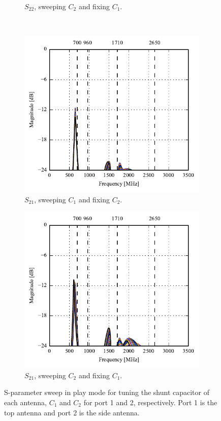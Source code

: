 \begin{figure}[htbp]
\begin{subfigure}[b]{0.49\linewidth}
        \caption{$S_{22}$, sweeping $C_2$ and fixing $C_1$.}
    \end{subfigure}
~
    \begin{subfigure}[b]{0.49\linewidth}
        \centering
        \includegraphics{img/tech_sol/monopole/play_mode/s21_s11}
        \caption{$S_{21}$, sweeping $C_1$ and fixing $C_2$.}
    \end{subfigure}
    \hfill
    \begin{subfigure}[b]{0.49\linewidth}
        \centering
        \includegraphics{img/tech_sol/monopole/play_mode/s21_s22}
        \caption{$S_{21}$, sweeping $C_2$ and fixing $C_1$.}
    \end{subfigure}
    \caption{S-parameter sweep in play mode for tuning the shunt capacitor of each antenna, $C_1$ and $C_2$ for port 1 and 2, respectively. Port 1 is the top antenna and port 2 is the side antenna.}
    \label{fig:sparam_mono_play_mode}
\end{figure}

